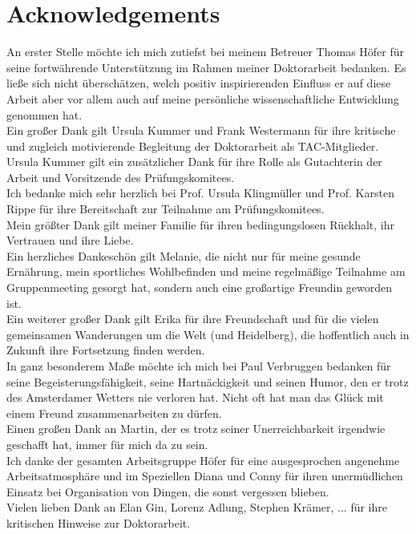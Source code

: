 \chapter*{Acknowledgements}
\thispagestyle{plain2}


An erster Stelle m\"ochte ich mich zutiefst bei meinem Betreuer Thomas H\"ofer f\"ur seine fortw\"ahrende Unterst\"utzung im Rahmen meiner Doktorarbeit  bedanken. Es lie\ss{}e sich nicht \"ubersch\"atzen, welch positiv inspirierenden Einfluss er auf diese Arbeit aber vor allem auch auf meine pers\"onliche wissenschaftliche Entwicklung genommen hat. \\

Ein gro\ss{}er Dank gilt Ursula Kummer und Frank Westermann f\"ur ihre kritische und zugleich motivierende Begleitung der Doktorarbeit als TAC-Mitglieder. Ursula Kummer gilt ein zus\"atzlicher Dank f\"ur ihre Rolle als Gutachterin der Arbeit und Vorsitzende des Pr\"ufungskomitees.\\

Ich bedanke mich sehr herzlich bei Prof. Ursula Klingm\"uller und Prof. Karsten Rippe f\"ur ihre Bereitschaft zur Teilnahme am Pr\"ufungskomitees.\\

Mein gr\"o\ss{}ter Dank gilt meiner Familie f\"{u}r ihren bedingungslosen R\"{u}ckhalt, ihr Vertrauen und ihre Liebe.\\

Ein herzliches Dankesch\"{o}n gilt Melanie, die nicht nur f\"{u}r meine gesunde Ern\"{a}hrung, mein sportliches Wohlbefinden und meine regelm\"{a}\ss{}ige Teilnahme am Gruppenmeeting gesorgt hat, sondern auch eine gro\ss{}artige Freundin geworden ist. \\      

Ein weiterer gro\ss{}er Dank gilt Erika f\"ur ihre Freundschaft und f\"ur die vielen gemeinsamen Wanderungen um die Welt (und Heidelberg), die hoffentlich auch in Zukunft ihre Fortsetzung finden werden.\\

In ganz besonderem Ma\ss{}e m\"{o}chte ich mich bei Paul Verbruggen bedanken f\"ur seine Begeisterungsf\"{a}higkeit, seine Hartn\"{a}ckigkeit und seinen Humor, den er trotz des Amsterdamer Wetters nie verloren hat. Nicht oft hat man das Gl\"{u}ck mit einem Freund zusammenarbeiten zu d\"{u}rfen.\\

Einen gro\ss{}en Dank an Martin, der es trotz seiner Unerreichbarkeit irgendwie geschafft hat, immer f\"{u}r mich da zu sein.\\

Ich danke der gesamten Arbeitsgruppe H\"{o}fer f\"{u}r eine ausgesprochen angenehme Arbeitsatmosph\"{a}re und im Speziellen Diana und Conny f\"ur ihren unerm\"{u}dlichen Einsatz bei Organisation von Dingen, die sonst vergessen blieben.\\

Vielen lieben Dank an Elan Gin, Lorenz Adlung, Stephen Kr\"{a}mer, ... f\"{u}r ihre kritischen Hinweise zur Doktorarbeit.    